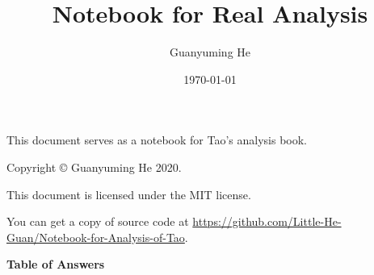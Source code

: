 \documentclass[11pt]{article}
\author{Guanyuming He}
\title{Notebook for Real Analysis}
\date{\today}
\begin{document}
\maketitle

\begin{center}
This document serves as a notebook for Tao's analysis book.
\end{center}

\vspace{\fill}

\begin{center}
Copyright \copyright{} Guanyuming He 2020. 

This document is licensed under the MIT license.

You can get a copy of source code at 
\url{https://github.com/Little-He-Guan/Notebook-for-Analysis-of-Tao}.
\end{center}

\newpage
{}
\tableofcontents

\newpage


\newpage
{}
\pagestyle{headings}



\newpage


\newpage


\newpage


\newpage
\begin{center}
\begin{Large}
\textbf{Table of Answers}
\end{Large}
\end{center}
\end{document}
